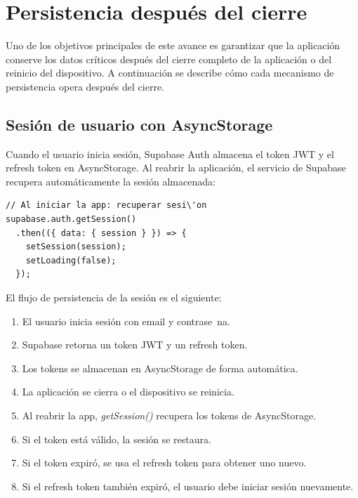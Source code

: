 
\section{Persistencia despu\'es del cierre}

Uno de los objetivos principales de este avance es garantizar que la
aplicaci\'on conserve los datos cr\'iticos despu\'es del cierre
completo de la aplicaci\'on o del reinicio del dispositivo. A
continuaci\'on se describe c\'omo cada mecanismo de persistencia
opera despu\'es del cierre.

\subsection{Sesi\'on de usuario con AsyncStorage}

Cuando el usuario inicia sesi\'on, Supabase Auth almacena el token
JWT y el refresh token en AsyncStorage. Al reabrir la aplicaci\'on,
el servicio de Supabase recupera autom\'aticamente la sesi\'on
almacenada:

\begin{lstlisting}
// Al iniciar la app: recuperar sesi\'on
supabase.auth.getSession()
  .then(({ data: { session } }) => {
    setSession(session);
    setLoading(false);
  });
\end{lstlisting}

El flujo de persistencia de la sesi\'on es el siguiente:

\begin{enumerate}
  \item El usuario inicia sesi\'on con email y contrase~na.
  \item Supabase retorna un token JWT y un refresh token.
  \item Los tokens se almacenan en AsyncStorage de forma
    autom\'atica.
  \item La aplicaci\'on se cierra o el dispositivo se reinicia.
  \item Al reabrir la app, \textit{getSession()} recupera los
    tokens de AsyncStorage.
  \item Si el token est\'a v\'alido, la sesi\'on se restaura.
  \item Si el token expir\'o, se usa el refresh token para
    obtener uno nuevo.
  \item Si el refresh token tambi\'en expir\'o, el usuario
    debe iniciar sesi\'on nuevamente.
\end{enumerate}

